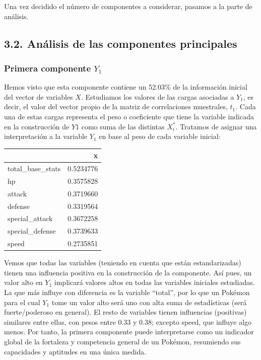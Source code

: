 \documentclass[
  12pt,
]{extreport}
\begin{document}
Una vez decidido el número de componentes a considerar, pasamos a la
parte de análisis.

\subsection{3.2. Análisis de las componentes
principales}\label{anuxe1lisis-de-las-componentes-principales}

\subsubsection{\texorpdfstring{Primera componente
\(Y_1\)}{Primera componente Y\_1}}\label{primera-componente-y_1}

Hemos visto que esta componente contiene un 52.03\% de la información
inicial del vector de variables \(X\). Estudiamos los valores de las
cargas asociadas a \(Y_1\), es decir, el valor del vector propio de la
matriz de correlaciones muestrales, \(t_1\). Cada una de estas cargas
representa el peso o coeficiente que tiene la variable indicada en la
construcción de \(Y1\) como suma de las distintas \(X_i^*\). Tratamos de
asignar una interpretación a la variable \(Y_1\) en base al peso de cada
variable inicial:

\begin{table}[H]
\centering\begingroup\fontsize{10.5}{12.5}\selectfont

\begin{tabular}{lr}
\toprule
  & x\\
\midrule
total\_base\_stats & 0.5234776\\
hp & 0.3575828\\
attack & 0.3719660\\
defense & 0.3319564\\
special\_attack & 0.3672258\\
\addlinespace
special\_defense & 0.3739633\\
speed & 0.2735851\\
\bottomrule
\end{tabular}
\endgroup{}
\end{table}

Vemos que todas las variables (teniendo en cuenta que están
estandarizadas) tienen una influencia positiva en la construcción de la
componente. Así pues, un valor alto en \(Y_1\) implicará valores altos
en todas las variables iniciales estudiadas. La que más influye con
diferencia es la variable ``total'', por lo que un Pokémon para el cual
\(Y_1\) tome un valor alto será uno con alta suma de estadísticas (será
fuerte/poderoso en general). El resto de variables tienen influencias
(positivas) similares entre ellas, con pesos entre 0.33 y 0.38; excepto
speed, que influye algo menos. Por tanto, la primera componente puede
interpretarse como un indicador global de la fortaleza y competencia
general de un Pokémon, resumiendo sus capacidades y aptitudes en una
única medida.
\end{document}
